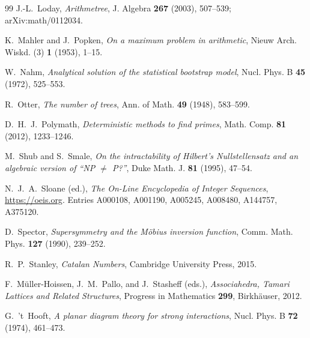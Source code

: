 \documentclass[11pt]{article}
\numberwithin{equation}{section}
\theoremstyle{plain}
\theoremstyle{definition}
\theoremstyle{remark}
\begin{document}
\begin{thebibliography}{99}
J.-L.~Loday,
\emph{Arithmetree},
J. Algebra \textbf{267} (2003), 507--539; arXiv:math/0112034.

K.~Mahler and J.~Popken,
\emph{On a maximum problem in arithmetic},
Nieuw Arch. Wiskd. (3) \textbf{1} (1953), 1--15.

W.~Nahm,
\emph{Analytical solution of the statistical bootstrap model},
Nucl. Phys. B \textbf{45} (1972), 525--553.

R.~Otter,
\emph{The number of trees},
Ann. of Math. \textbf{49} (1948), 583--599.

D.~H.~J.~Polymath,
\emph{Deterministic methods to find primes},
Math. Comp. \textbf{81} (2012), 1233--1246.

M.~Shub and S.~Smale,
\emph{On the intractability of Hilbert's Nullstellensatz and an algebraic version of
``NP $\neq$ P?''},
Duke Math. J. \textbf{81} (1995), 47--54.

N.~J.~A.~Sloane (ed.),
\emph{The On-Line Encyclopedia of Integer Sequences},
\url{https://oeis.org}. Entries A000108, A001190, A005245, A008480, A144757, A375120.

D.~Spector,
\emph{Supersymmetry and the M\"obius inversion function},
Comm. Math. Phys. \textbf{127} (1990), 239--252.

R.~P.~Stanley,
\emph{Catalan Numbers},
Cambridge University Press, 2015.

F.~M\"uller-Hoissen, J.~M.~Pallo, and J.~Stasheff (eds.),
\emph{Associahedra, Tamari Lattices and Related Structures},
Progress in Mathematics \textbf{299}, Birkh\"auser, 2012.

G.~'t~Hooft,
\emph{A planar diagram theory for strong interactions},
Nucl. Phys. B \textbf{72} (1974), 461--473.

\end{thebibliography}
\end{document}
